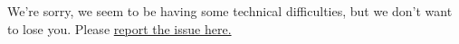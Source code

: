 \hypertarget{the-new-york-times}{%
\section{\texorpdfstring{}{The New York Times}}\label{the-new-york-times}}

We're sorry, we seem to be having some technical difficulties, but we
don't want to lose you. Please
\href{mailto:help@NYTimes.com?subject=Internal\%20Server\%20Error}{report
the issue here.}
